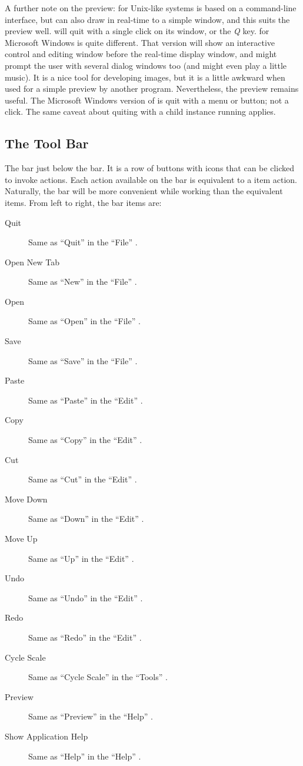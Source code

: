 			A further note on the preview: \IXpov{} for Unix-like
			systems is based on a command-line interface, but can
			also draw in real-time to a simple 
			window, and this suits the preview well. \IXpov{}
			will quit with a single click on its window, or the
			\emph{Q} key. \IXpov{} for Microsoft Windows is quite
			different. That version will show an interactive control
			and editing window before the real-time display window,
			and might prompt the user with several dialog windows
			too (and might even play a little music). It is a nice
			tool for developing \IXpov{} images, but it is a little
			awkward when used for a simple preview by another
			program. Nevertheless,
			the preview remains useful. The Microsoft Windows version
			of \IXpov{} is quit with a menu or button; not a click.
			The same caveat about quiting \IXpkg{} with
			a child \IXpov{} instance running applies.


		\subsection{The Tool Bar}%
		The  bar just below the 
		bar. It is a row of buttons with icons that can be
		clicked to invoke actions. Each action available on
		the  bar is equivalent to a  item
		action. Naturally, the  bar will be more
		convenient while working than the equivalent 
		items. From left to right, the  bar
		items are:

			\begin{description}
			  \item[Quit] Same as ``Quit'' in the
			  ``File'' .
			  \item[Open New Tab] Same as ``New'' in the
			  ``File'' .
			  \item[Open] Same as ``Open'' in the
			  ``File'' .
			  \item[Save] Same as ``Save'' in the
			  ``File'' .
			  \item[Paste] Same as ``Paste'' in the
			  ``Edit'' .
			  \item[Copy] Same as ``Copy'' in the
			  ``Edit'' .
			  \item[Cut] Same as ``Cut'' in the
			  ``Edit'' .
			  \item[Move Down] Same as ``Down'' in the
			  ``Edit'' .
			  \item[Move Up] Same as ``Up'' in the
			  ``Edit'' .
			  \item[Undo] Same as ``Undo'' in the
			  ``Edit'' .
			  \item[Redo] Same as ``Redo'' in the
			  ``Edit'' .
			  \item[Cycle Scale] Same as ``Cycle Scale'' in the
			  ``Tools'' .
			  \item[Preview] Same as ``Preview'' in the
			  ``Help'' .
			  \item[Show Application Help] Same as ``Help'' in the
			  ``Help'' .
			\end{description}
			
